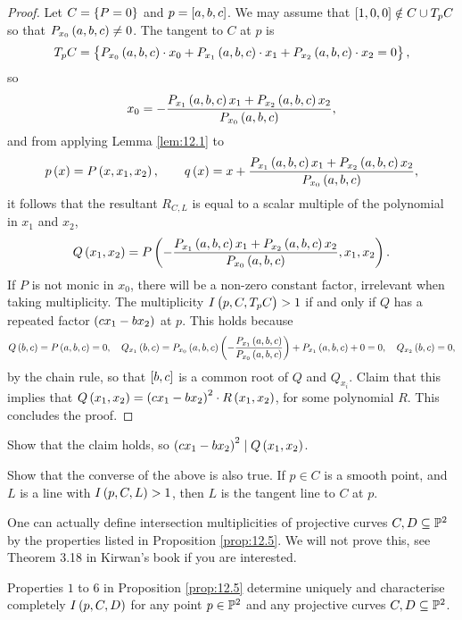 \begin{proof}
Let $ C = \cbr{P = 0} $ and $ p = \sbr{a, b, c} $. We may assume that $ \sbr{1, 0, 0} \notin C \cup T_pC $ so that $ P_{x_0}\br{a, b, c} \ne 0 $. The tangent to $ C $ at $ p $ is
$$ T_pC = \cbr{P_{x_0}\br{a, b, c} \cdot x_0 + P_{x_1}\br{a, b, c} \cdot x_1 + P_{x_2}\br{a, b, c} \cdot x_2 = 0}, $$
so
$$ x_0 = -\dfrac{P_{x_1}\br{a, b, c}x_1 + P_{x_2}\br{a, b, c}x_2}{P_{x_0}\br{a, b, c}}, $$
and from applying Lemma \ref{lem:12.1} to
$$ p\br{x} = P\br{x, x_1, x_2}, \qquad q\br{x} = x + \dfrac{P_{x_1}\br{a, b, c}x_1 + P_{x_2}\br{a, b, c}x_2}{P_{x_0}\br{a, b, c}}, $$
it follows that the resultant $ R_{C, L} $ is equal to a scalar multiple of the polynomial in $ x_1 $ and $ x_2 $,
$$ Q\br{x_1, x_2} = P\br{-\dfrac{P_{x_1}\br{a, b, c}x_1 + P_{x_2}\br{a, b, c}x_2}{P_{x_0}\br{a, b, c}}, x_1, x_2}. $$
If $ P $ is not monic in $ x_0 $, there will be a non-zero constant factor, irrelevant when taking multiplicity. The multiplicity $ I\br{p, C, T_pC} > 1 $ if and only if $ Q $ has a repeated factor $ \br{cx_1 - bx_2} $ at $ p $. This holds because
$$ Q\br{b, c} = P\br{a, b, c} = 0, \quad Q_{x_1}\br{b, c} = P_{x_0}\br{a, b, c}\br{-\dfrac{P_{x_1}\br{a, b, c}}{P_{x_0}\br{a, b, c}}} + P_{x_1}\br{a, b, c} + 0 = 0, \quad Q_{x_2}\br{b, c} = 0, $$
by the chain rule, so that $ \sbr{b, c} $ is a common root of $ Q $ and $ Q_{x_i} $. Claim that this implies that $ Q\br{x_1, x_2} = \br{cx_1 - bx_2}^2 \cdot R\br{x_1, x_2} $, for some polynomial $ R $. This concludes the proof.
\end{proof}

\begin{exercise}
Show that the claim holds, so $ \br{cx_1 - bx_2}^2 \mid Q\br{x_1, x_2} $.
\end{exercise}

\begin{exercise}
Show that the converse of the above is also true. If $ p \in C $ is a smooth point, and $ L $ is a line with $ I\br{p, C, L} > 1 $, then $ L $ is the tangent line to $ C $ at $ p $.
\end{exercise}

\pagebreak

One can actually define intersection multiplicities of projective curves $ C, D \subseteq \P^2 $ by the properties listed in Proposition \ref{prop:12.5}. We will not prove this, see Theorem 3.18 in Kirwan's book if you are interested.

\begin{proposition}
\label{prop:12.8}
Properties $ 1 $ to $ 6 $ in Proposition \ref{prop:12.5} determine uniquely and characterise completely $ I\br{p, C, D} $ for any point $ p \in \P^2 $ and any projective curves $ C, D \subseteq \P^2 $.
\end{proposition}

